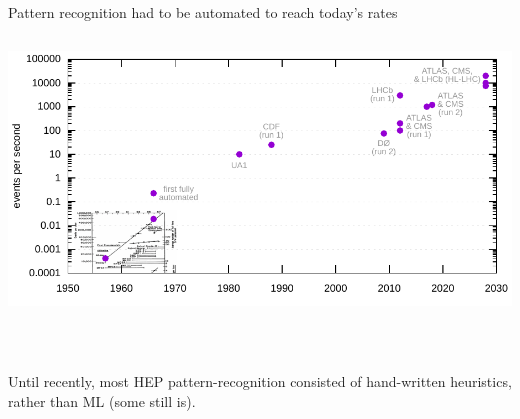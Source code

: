 \documentclass[aspectratio=169]{beamer}
\begin{document}
\begin{frame}{Pattern recognition had to be automated to reach today's rates}
\vspace{0.25 cm}
\begin{columns}
\includegraphics[width=\linewidth]{img/event-rates.pdf}
\end{columns}
\end{frame}

\begin{frame}{\mbox{ }}
\vspace{0.5 cm}
\Large

Until recently, most HEP pattern-recognition consisted of hand-written heuristics, rather than ML (some still is).

\vspace{1 cm}
\end{frame}
\end{document}
